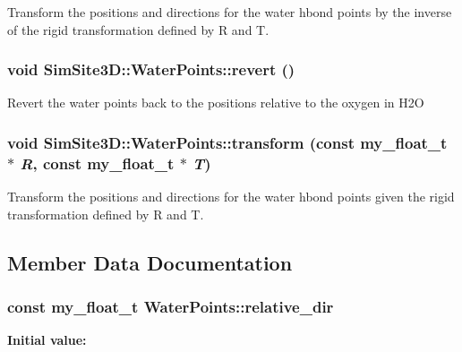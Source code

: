 Transform the positions and directions for the water hbond points by the inverse of the rigid transformation defined by R and T. 
\subsubsection{\setlength{\rightskip}{0pt plus 5cm}void SimSite3D::Water\-Points::revert ()\hspace{0.3cm}{\tt  [inline]}}\label{classSimSite3D_1_1WaterPoints_ecc516195eeee66daeb5232b79566bb3}


Revert the water points back to the positions relative to the oxygen in H2O 
\subsubsection{\setlength{\rightskip}{0pt plus 5cm}void SimSite3D::Water\-Points::transform (const my\_\-float\_\-t $\ast$ {\em R}, const my\_\-float\_\-t $\ast$ {\em T})\hspace{0.3cm}{\tt  [inline]}}\label{classSimSite3D_1_1WaterPoints_28e85993b24ad7d2d9f690972b399d19}


Transform the positions and directions for the water hbond points given the rigid transformation defined by R and T. 

\subsection{Member Data Documentation}
\subsubsection{\setlength{\rightskip}{0pt plus 5cm}const my\_\-float\_\-t \bf{Water\-Points::relative\_\-dir}\hspace{0.3cm}{\tt  [static, private]}}\label{classSimSite3D_1_1WaterPoints_9983412b6966d9c04890f819f3512332}


\textbf{Initial value:}

